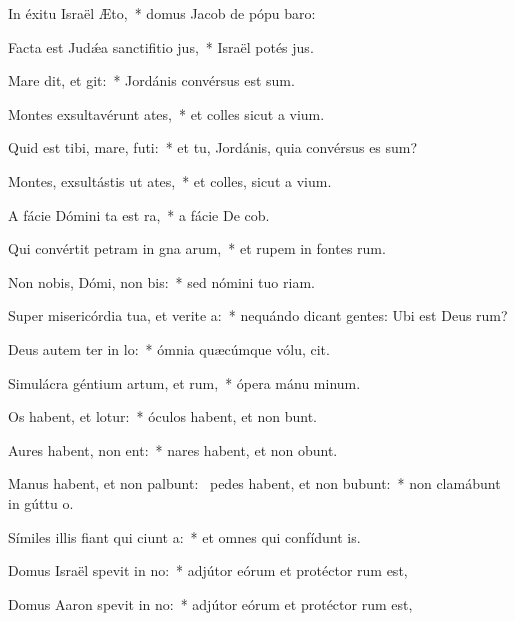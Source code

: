 \item In éxitu Israël  Æto,~* domus Jacob de pópu baro:
\item Facta est Judǽa sanctifitio jus,~* Israël potés jus.
\item Mare dit, et git:~* Jordánis convérsus est sum.
\item Montes exsultavérunt  ates,~* et colles sicut a vium.
\item Quid est tibi, mare,  futi:~* et tu, Jordánis, quia convérsus es sum?
\item Montes, exsultástis ut ates,~* et colles, sicut a vium.
\item A fácie Dómini ta est ra,~* a fácie De cob.
\item Qui convértit petram in gna arum,~* et rupem in fontes rum.
\item Non nobis, Dómi, non bis:~* sed nómini tuo  riam.
\item Super misericórdia tua, et verite a:~* nequándo dicant gentes: Ubi est Deus rum?
\item Deus autem ter in lo:~* ómnia quæcúmque vólu, cit.
\item Simulácra géntium artum, et rum,~* ópera mánu minum.
\item Os habent, et  lotur:~* óculos habent, et non bunt.
\item Aures habent,  non ent:~* nares habent, et non obunt.
\item Manus habent, et non palbunt:~\pscross{} pedes habent, et non bubunt:~* non clamábunt in gúttu o.
\item Símiles illis fiant qui ciunt a:~* et omnes qui confídunt  is.
\item Domus Israël spevit in no:~* adjútor eórum et protéctor rum est,
\item Domus Aaron spevit in no:~* adjútor eórum et protéctor rum est,
